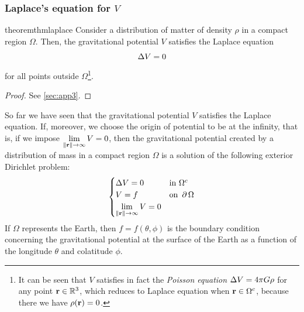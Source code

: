 \documentclass[../main.tex]{subfiles}
\begin{document}
\subsubsection{Laplace's equation for \texorpdfstring{$V$}{V}}\label{sec:laplace}
\begin{restatable}{theorem}{thmlaplace}\label{thm:laplace}
  Consider a distribution of matter of density $\rho$ in a compact region $\Omega$. Then, the gravitational potential $V$ satisfies the Laplace equation
  \begin{equation}
    \Delta V = 0
  \end{equation}
  for all points outside $\Omega$\footnote{It can be seen that $V$ satisfies in fact the \emph{Poisson equation} $\Delta V=4\pi G\rho$ for any point $\boldsymbol{\mathrm{r}}\in\mathbb{R}^3$, which reduces to Laplace equation when $\boldsymbol{\mathrm{r}}\in\Omega^c$, because there we have $\rho(\boldsymbol{\mathrm{r}})=0$.}.
\end{restatable}
\begin{proof}
  See \cref{sec:app3}.
\end{proof}
So far we have seen that the gravitational potential $V$ satisfies the Laplace equation. If, moreover, we choose the origin of potential to be at the infinity, that is, if we impose $\displaystyle\lim_{\left\|\boldsymbol{\mathrm{r}}\right\|\to\infty}V=0$, then the gravitational potential created by a distribution of mass in a compact region $\Omega$ is a solution of the following exterior Dirichlet problem:
\begin{equation}\label{eq:dirichletProblem}
  \begin{cases}
    \Delta V = 0 & \text{in } \Omega^c    \\
    V = f            & \text{on } \operatorname{\partial}{\Omega} \\
    \displaystyle\lim_{\left\|\boldsymbol{\mathrm{r}}\right\|\to\infty}V=0
  \end{cases}
\end{equation}
If $\Omega$ represents the Earth, then $f=f(\theta,\phi)$ is the boundary condition concerning the gravitational potential at the surface of the Earth as a function of the longitude $\theta$ and colatitude $\phi$.
\end{document}
